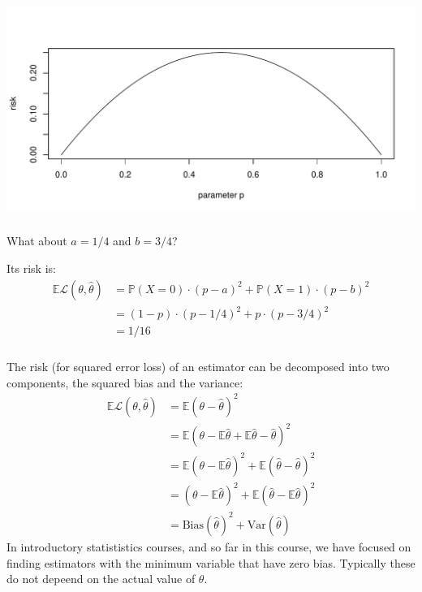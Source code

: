 \begin{frame}[fragile] \frametitle{}

\begin{center}
\includegraphics[width=\textwidth]{img/fig02.pdf}
\end{center}

\end{frame}

\begin{frame}[fragile] \frametitle{}

What about $a = 1/4$ and $b = 3/4$?

\pause Its risk is:
\begin{align*}
\mathbb{E} \mathcal{L} (\theta, \widehat{\theta})
&= \mathbb{P}(X = 0) \cdot (p - a)^2 + \mathbb{P}(X = 1) \cdot (p - b)^2 \\
&= (1-p) \cdot (p - 1/4)^2 + p \cdot (p - 3/4)^2 \\
&= 1 / 16
\end{align*}

\end{frame}

\begin{frame}[fragile] \frametitle{}

The risk (for squared error loss) of an estimator can
be decomposed into two components, the squared bias and
the variance:
\begin{align*}
\mathbb{E} \mathcal{L} (\theta, \widehat{\theta}) &=
\mathbb{E} (\theta - \widehat{\theta})^2 \\
&= \mathbb{E} (\theta - \mathbb{E}\widehat{\theta} + \mathbb{E}\widehat{\theta} - \widehat{\theta})^2 \\
&=\mathbb{E} (\theta - \mathbb{E}\widehat{\theta})^2 + \mathbb{E} (\widehat{\theta} - \widehat{\theta})^2 \\
&=(\theta - \mathbb{E}\widehat{\theta})^2 + \mathbb{E} (\widehat{\theta} - \mathbb{E}\widehat{\theta})^2 \\
&= \text{Bias}(\widehat{\theta})^2 + \text{Var} (\widehat{\theta})
\end{align*}
\pause In introductory statististics courses, and so far in this course,
we have focused on finding estimators with the minimum variable that have
zero bias. Typically these do not depeend on the actual value of $\theta$.

\end{frame}

